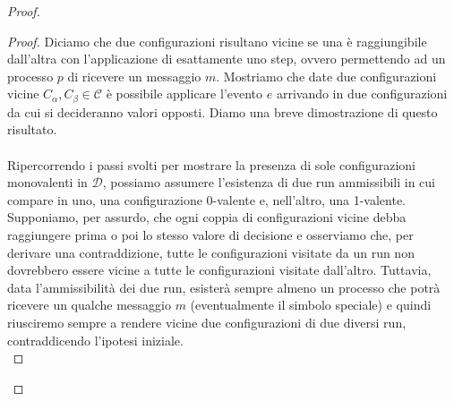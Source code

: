 \documentclass{article}
\begin{document}
\begin{proof}
\begin{proof}
Diciamo che due configurazioni risultano vicine se una è raggiungibile dall'altra con l'applicazione di esattamente uno step, ovvero permettendo ad un processo $p$ di ricevere un messaggio $m$. Mostriamo che date due configurazioni vicine $C_{\alpha}, C_{\beta} \in \mathcal{C}$ è possibile applicare l'evento $e$ arrivando in due configurazioni da cui si decideranno valori opposti. Diamo una breve dimostrazione di questo risultato. \\
\\
Ripercorrendo i passi svolti per mostrare la presenza di sole configurazioni monovalenti in $\mathcal{D}$, possiamo assumere l'esistenza di due run ammissibili in cui compare in uno, una configurazione 0-valente e, nell'altro, una 1-valente. Supponiamo, per assurdo, che ogni coppia di configurazioni vicine debba raggiungere prima o poi lo stesso valore di decisione e osserviamo che, per derivare una contraddizione, tutte le configurazioni visitate da un run non dovrebbero essere vicine a tutte le configurazioni visitate dall'altro. Tuttavia, data l'ammissibilità dei due run, esisterà sempre almeno un processo che potrà ricevere un qualche messaggio $m$ (eventualmente il simbolo speciale) e quindi riusciremo sempre a rendere vicine due configurazioni di due diversi run, contraddicendo l'ipotesi iniziale. \\ 



\end{proof}
\end{proof}
\end{document}
